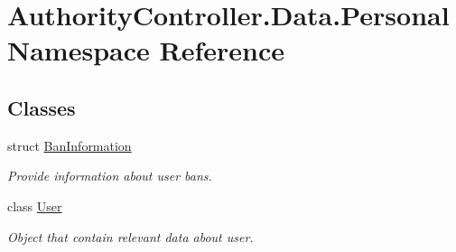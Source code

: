 \hypertarget{namespace_authority_controller_1_1_data_1_1_personal}{}\section{Authority\+Controller.\+Data.\+Personal Namespace Reference}
\label{namespace_authority_controller_1_1_data_1_1_personal}
\subsection*{Classes}
\begin{DoxyCompactItemize}
\item 
struct \mbox{\hyperlink{struct_authority_controller_1_1_data_1_1_personal_1_1_ban_information}{Ban\+Information}}
\begin{DoxyCompactList}\small\item\em Provide information about user bans. \end{DoxyCompactList}\item 
class \mbox{\hyperlink{class_authority_controller_1_1_data_1_1_personal_1_1_user}{User}}
\begin{DoxyCompactList}\small\item\em Object that contain relevant data about user. \end{DoxyCompactList}\end{DoxyCompactItemize}
